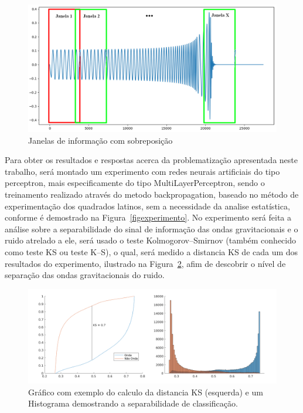 \begin{figure}[ht]
\centering
\includegraphics[width=1\textwidth]{figuras/janelas.png}
\caption{Janelas de informação com sobreposição}
\label{figjanela}
\end{figure}

Para obter os resultados e respostas acerca da problematização apresentada neste trabalho, será montado um experimento com redes neurais artificiais do tipo perceptron, mais especificamente do tipo MultiLayerPerceptron, sendo o treinamento realizado através do metodo backpropagation, baseado no método de experimentação dos quadrados latinos, sem a necessidade da analise estatística, conforme é demostrado na Figura~\ref{figexperimento}. No experimento será feita a análise sobre a separabilidade do sinal de informação das ondas gravitacionais e o ruido atrelado a ele, será usado o teste Kolmogorov–Smirnov (também conhecido como teste KS ou teste K–S), o qual, será medido a distancia KS de cada um dos resultados do experimento, ilustrado na Figura~\ref{figkolmogorov}, afim de descobrir o nível de separação das ondas gravitacionais do ruido.

\begin{figure}[ht]
\centering
\includegraphics[width=1\textwidth]{figuras/test-kolmogorov.png}
\caption{Gráfico com exemplo do calculo da distancia KS (esquerda) e um Histograma demostrando a separabilidade de classificação.}
\label{figkolmogorov}
\end{figure}

